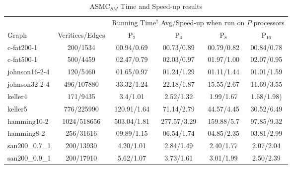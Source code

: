 \documentclass[11pt]{article}
\begin{document}
\linespread{1}
\begin{table*}[ht!]
\caption{ASMC$_{SM}$ Time and Speed-up results}\label{tab:spar_su_par_table}
\begin{footnotesize}
\begin{center}
\begin{tabular}{|l||c||c|c|c|c|}
\hline
&              & \multicolumn{4}{|c|}{Running Time$^{\dag}$ Avg/Speed-up when run on $P$ processors}\\
\cline{3-6}
Graph&Veritices/Edges& 	P$_2$           &P$_4$            &P$_8$            &P$_{16}$   \\
\hline
c-fat200-1 	    &200/1534 		 &00.94/0.69 &00.73/0.89 &00.79/0.82 &00.84/0.78\\  %
c-fat500-1 	    &500/4459 		 &02.47/0.79 &02.03/0.97 &01.97/1.00 &02.07/0.95\\  %
\hline                                                                                   
johnson16-2-4 	&120/5460 		 &01.65/0.97 &01.24/1.29 &01.11/1.44 &01.01/1.59\\  %
johnson32-2-4 	&496/107880 	 &33.32/1.24 &22.18/1.87 &15.55/2.67 &11.69/3.55\\  %
\hline                                  
keller4      	&171/9435 		 &3.4/1.01     &2.52/1.32     &1.99/1.67   &1.68/1.98)\\  %
keller5 	    &776/225990 	 &120.91/1.64 &71.14/2.79 &44.57/4.45 &30.52/6.49\\
\hline                                                                                   
hamming10-2 	&1024/518656 	 &503.04/1.81 &277.57/3.29 &159.88/5.7  &97.85/9.32\\
hamming8-2 	    &256/31616 	     &09.89/1.15 &06.54/1.74 &04.85/2.35 &03.81/2.99\\
\hline                                                                                   
san200\_0.7\_1 	&200/13930 	     &4.20/1.01 &2.84/1.49 &2.40/1.77 &2.07/2.04\\%
san200\_0.9\_1 	&200/17910 	     &5.62/1.07 &3.73/1.61 &3.01/1.99 &2.50/2.39\\

\end{tabular}
\end{center}
\end{footnotesize}
\end{table*}
\end{document}

